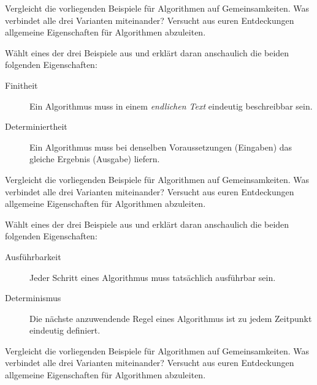 \documentclass[11pt, a5paper, landscape]{arbeitsblatt}
\begin{document}
\ReiheTitel*

\begin{aufgabe}
Vergleicht die vorliegenden Beispiele für Algorithmen auf Gemeinsamkeiten. Was
verbindet alle drei Varianten miteinander? Versucht aus euren Entdeckungen
allgemeine Eigenschaften für Algorithmen abzuleiten.
\end{aufgabe}

\begin{aufgabe}
Wählt eines der drei Beispiele aus und erklärt daran anschaulich die beiden
folgenden Eigenschaften:
\begin{description}
	\item[Finitheit] Ein Algorithmus muss in einem \emph{endlichen Text} eindeutig beschreibbar
		sein.
	\item[Determiniertheit] Ein Algorithmus muss bei denselben Voraussetzungen (Eingaben) das gleiche
		Ergebnis (Ausgabe) liefern.
\end{description}
\end{aufgabe}

\newpage\setcounter{aufgabe}{0}
\ReiheTitel*

\begin{aufgabe}
Vergleicht die vorliegenden Beispiele für Algorithmen auf Gemeinsamkeiten. Was
verbindet alle drei Varianten miteinander? Versucht aus euren Entdeckungen
allgemeine Eigenschaften für Algorithmen abzuleiten.
\end{aufgabe}

\begin{aufgabe}
Wählt eines der drei Beispiele aus und erklärt daran anschaulich die beiden
folgenden Eigenschaften:
\begin{description}
	\item[Ausführbarkeit] Jeder Schritt eines Algorithmus muss tatsächlich ausführbar sein.
	\item[Determinismus] Die nächste anzuwendende Regel eines Algorithmus ist zu jedem Zeitpunkt
		eindeutig definiert.
\end{description}
\end{aufgabe}

\newpage\setcounter{aufgabe}{0}
\ReiheTitel*

\begin{aufgabe}
Vergleicht die vorliegenden Beispiele für Algorithmen auf Gemeinsamkeiten. Was
verbindet alle drei Varianten miteinander? Versucht aus euren Entdeckungen
allgemeine Eigenschaften für Algorithmen abzuleiten.
\end{aufgabe}
\end{document}
